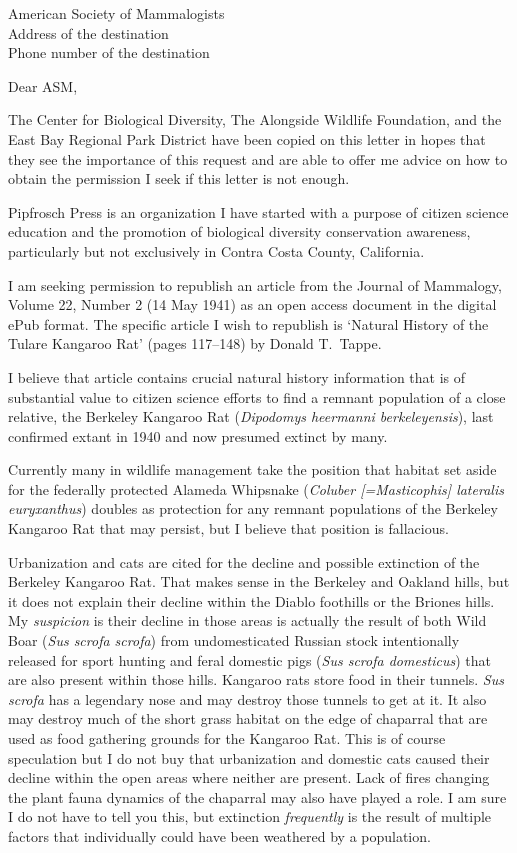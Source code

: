 \documentclass[letterpaper,11pt]{letter}
\begin{document}
\begin{letter}{American Society of Mammalogists\\Address of the destination\\Phone number of the destination}

\opening{Dear ASM,}

The Center for Biological Diversity, The Alongside Wildlife Foundation, and the East Bay Regional Park District have been copied on this letter in hopes that they see the importance of this request and are able to offer me advice on how to obtain the permission I seek if this letter is not enough.

Pipfrosch Press is an organization I have started with a purpose of citizen science education and the promotion of biological diversity conservation awareness, particularly but not exclusively in Contra Costa County, California.

I am seeking permission to republish an article from the Journal of Mammalogy, Volume 22, Number 2 (14 May 1941) as an open access document in the digital ePub format. The specific article I wish to republish is `Natural History of the Tulare Kangaroo Rat' (pages 117--148) by Donald T.\ Tappe.

I believe that article contains crucial natural history information that is of substantial value to citizen science efforts to find a remnant population of a close relative, the Berkeley Kangaroo Rat (\textit{Dipodomys heermanni berkeleyensis}), last confirmed extant in 1940 and now presumed extinct by many.

Currently many in wildlife management take the position that habitat set aside for the federally protected Alameda Whipsnake (\textit{Coluber [=Masticophis] lateralis euryxanthus}) doubles as protection for any remnant populations of the Berkeley Kangaroo Rat that may persist, but I believe that position is fallacious.

Urbanization and cats are cited for the decline and possible extinction of the Berkeley Kangaroo Rat. That makes sense in the Berkeley and Oakland hills, but it does not explain their decline within the Diablo foothills or the Briones hills. My \emph{suspicion} is their decline in those areas is actually the result of both Wild Boar (\textit{Sus scrofa scrofa}) from undomesticated Russian stock intentionally released for sport hunting and feral domestic pigs (\textit{Sus scrofa domesticus}) that are also present within those hills. Kangaroo rats store food in their tunnels. \textit{Sus scrofa} has a legendary nose and may destroy those tunnels to get at it. It also may destroy much of the short grass habitat on the edge of chaparral that are used as food gathering grounds for the Kangaroo Rat. This is of course speculation but I do not buy that urbanization and domestic cats caused their decline within the open areas where neither are present. Lack of fires changing the plant fauna dynamics of the chaparral may also have played a role. I am sure I do not have to tell you this, but extinction \emph{frequently} is the result of multiple factors that individually could have been weathered by a population.


\end{letter}
\end{document}
